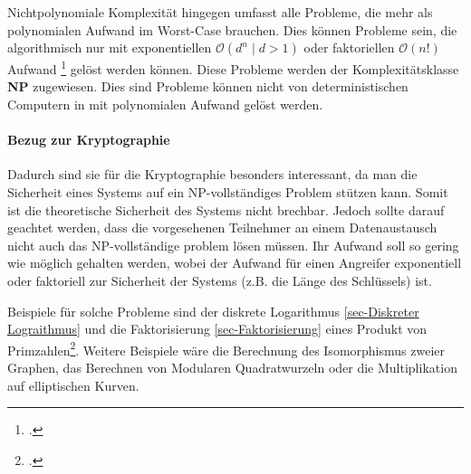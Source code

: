     Nichtpolynomiale Komplexität hingegen umfasst alle Probleme, die mehr als polynomialen Aufwand im Worst-Case brauchen. Dies können Probleme sein, die algorithmisch nur mit exponentiellen $\mathcal{O}(d^{n} \mid d > 1)$ oder faktoriellen $\mathcal{O}(n!)$ Aufwand \footcite{wiki.komplex} gelöst werden können. 
    Diese Probleme werden der Komplexitätsklasse \textbf{NP} zugewiesen. Dies sind Probleme können nicht von deterministischen Computern in mit polynomialen Aufwand gelöst werden. 
    
    \paragraph{Bezug zur Kryptographie} Dadurch sind sie für die Kryptographie besonders interessant, da man die Sicherheit eines Systems auf ein NP-vollständiges Problem stützen kann. Somit ist die theoretische Sicherheit des Systems nicht brechbar. Jedoch sollte darauf geachtet werden, dass die vorgesehenen Teilnehmer an einem Datenaustausch nicht auch das NP-vollständige problem lösen müssen. Ihr Aufwand soll so gering wie möglich gehalten werden, wobei der Aufwand für einen Angreifer exponentiell oder faktoriell zur Sicherheit der Systems (z.B. die Länge des Schlüssels) ist. 

    Beispiele für solche Probleme sind der diskrete Logarithmus \ref{sec-Diskreter Lograithmus} und die Faktorisierung \ref{sec-Faktorisierung} eines Produkt von Primzahlen\footcite[179]{BSW.2015}. Weitere Beispiele wäre die Berechnung des Isomorphismus zweier Graphen, das Berechnen von Modularen Quadratwurzeln oder die Multiplikation auf elliptischen Kurven.


    



